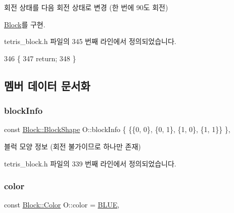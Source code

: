 회전 상태를 다음 회전 상태로 변경 (한 번에 90도 회전) 



\mbox{\hyperlink{class_block_af1499ad7e48fb750581b471d0d5bb0e0}{Block}}를 구현.



tetris\+\_\+block.\+h 파일의 345 번째 라인에서 정의되었습니다.


\begin{DoxyCode}
346     \{
347         \textcolor{keywordflow}{return};
348     \}
\end{DoxyCode}


\subsection{멤버 데이터 문서화}
\mbox{\label{class_o_aff83495bf15903121bea8f8c5d7f2a11}} 
\subsubsection{\texorpdfstring{block\+Info}{blockInfo}}
{\footnotesize\ttfamily const \mbox{\hyperlink{class_block_aca5d951639f113e2ebd7856209d6b9ab}{Block\+::\+Block\+Shape}} O\+::block\+Info \{ \{\{0, 0\}, \{0, 1\}, \{1, 0\}, \{1, 1\}\} \}\hspace{0.3cm}{\ttfamily [static]}, {\ttfamily [private]}}



블럭 모양 정보 (회전 불가이므로 하나만 존재) 



tetris\+\_\+block.\+h 파일의 339 번째 라인에서 정의되었습니다.

\mbox{\label{class_o_a7005197d577eee8429ccaee14749e800}} 
\subsubsection{\texorpdfstring{color}{color}}
{\footnotesize\ttfamily const \mbox{\hyperlink{class_block_ad054b4ac51df79aa910040b2a2fdf7b5}{Block\+::\+Color}} O\+::color = \mbox{\hyperlink{class_block_ad054b4ac51df79aa910040b2a2fdf7b5a770f3d9456df6e3e286c001f0ffc835f}{B\+L\+UE}}\hspace{0.3cm}{\ttfamily [static]}, {\ttfamily [private]}}




